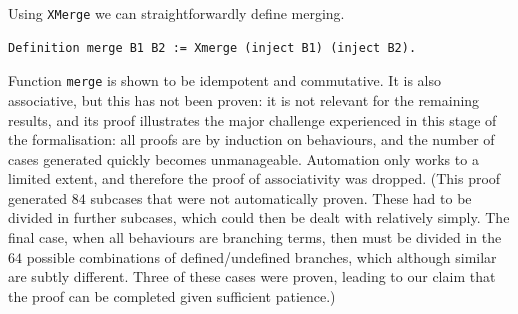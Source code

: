 \documentclass[runningheads]{llncs}
\begin{document}
Using \lstinline+XMerge+ we can straightforwardly define merging.
\begin{lstlisting}
Definition merge B1 B2 := Xmerge (inject B1) (inject B2).
\end{lstlisting}

Function \lstinline+merge+ is shown to be idempotent and commutative.
It is also associative, but this has not been proven: it is not relevant for the remaining results,
and its proof illustrates the major challenge experienced in this stage of the formalisation: all
proofs are by induction on behaviours, and the number of cases generated quickly becomes
unmanageable.
Automation only works to a limited extent, and therefore the proof of associativity was dropped.
(This proof generated $84$ subcases that were not automatically proven. These had to be divided in
further subcases, which could then be dealt with relatively simply. The final case, when all
behaviours are branching terms, then must be divided in the $64$ possible combinations of
defined/undefined branches, which although similar are subtly different. Three of these cases were
proven, leading to our claim that the proof can be completed given sufficient patience.)
\end{document}
